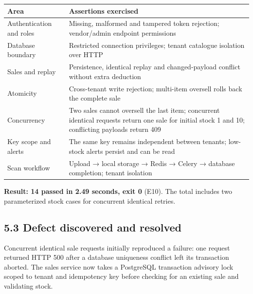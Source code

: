 \documentclass[
  11pt,
]{article}
\newcounter{none} %
\begin{document}
{\def\LTcaptype{none} %
\begin{longtable}[]{@{}
  >{\raggedright\arraybackslash}p{}
  >{\raggedright\arraybackslash}p{}@{}}
\toprule\noalign{}
\begin{minipage}[b]{\linewidth}\raggedright
Area
\end{minipage} & \begin{minipage}[b]{\linewidth}\raggedright
Assertions exercised
\end{minipage} \\
\midrule\noalign{}
\endhead
\bottomrule\noalign{}
\endlastfoot
Authentication and roles & Missing, malformed and tampered token
rejection; vendor/admin endpoint permissions \\
Database boundary & Restricted connection privileges; tenant catalogue
isolation over HTTP \\
Sales and replay & Persistence, identical replay and changed-payload
conflict without extra deduction \\
Atomicity & Cross-tenant write rejection; multi-item oversell rolls back
the complete sale \\
Concurrency & Two sales cannot oversell the last item; concurrent
identical requests return one sale for initial stock 1 and 10;
conflicting payloads return 409 \\
Key scope and alerts & The same key remains independent between tenants;
low-stock alerts persist and can be read \\
Scan workflow & Upload → local storage → Redis → Celery → database
completion; tenant isolation \\
\end{longtable}
}

\textbf{Result: 14 passed in 2.49 seconds, exit 0} (E10). The total
includes two parameterized stock cases for concurrent identical retries.

\subsection{5.3 Defect discovered and
resolved}\label{defect-discovered-and-resolved}

Concurrent identical sale requests initially reproduced a failure: one
request returned HTTP 500 after a database uniqueness conflict left its
transaction aborted. The sales service now takes a PostgreSQL
transaction advisory lock scoped to tenant and idempotency key before
checking for an existing sale and validating stock.
\end{document}
